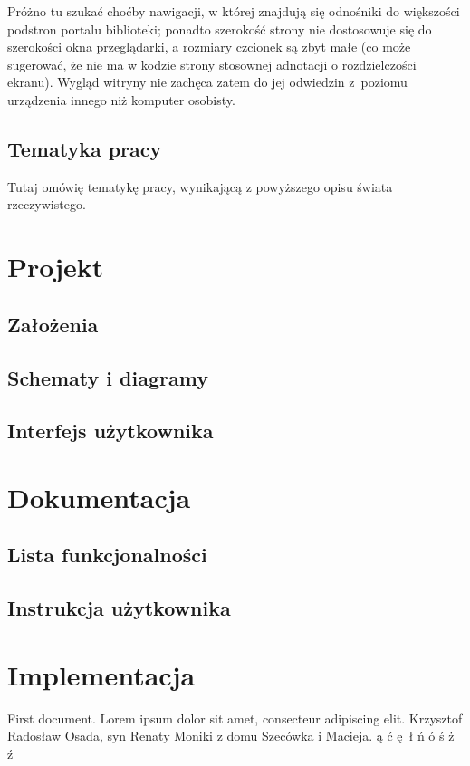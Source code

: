 \documentclass[12pt, a4paper]{article}
\begin{document}
Próżno tu szukać choćby nawigacji, w której znajdują się odnośniki do większości podstron portalu biblioteki; ponadto szerokość strony nie dostosowuje się do szerokości okna przeglądarki, a rozmiary czcionek są zbyt małe (co może sugerować, że nie ma w kodzie strony stosownej adnotacji o rozdzielczości ekranu). Wygląd witryny nie zachęca zatem do jej odwiedzin z~poziomu urządzenia innego niż komputer osobisty.

\subsection{Tematyka pracy}
Tutaj omówię tematykę pracy, wynikającą z powyższego opisu świata rzeczywistego.

\section{Projekt}

\subsection{Założenia}
\subsection{Schematy i diagramy}
\subsection{Interfejs użytkownika}

\section{Dokumentacja}
\subsection{Lista funkcjonalności}
\subsection{Instrukcja użytkownika}

\section{Implementacja}

First document. Lorem ipsum dolor sit amet, consecteur adipiscing elit.
Krzysztof Radosław Osada, syn Renaty Moniki z domu Szecówka i Macieja.
ą ć ę ł ń ó ś ż ź
\end{document}
